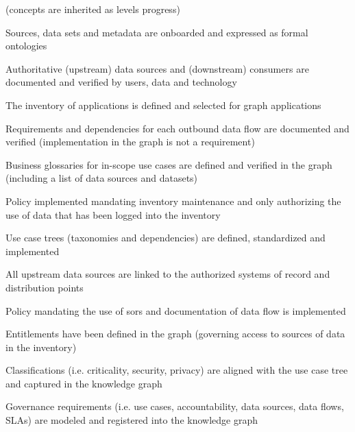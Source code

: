 \kgmmscoringsection

(concepts are inherited as levels progress)

\kgmmscoringlevelOne

\begin{scoring}

  \item Sources, data sets and metadata are onboarded and expressed as formal ontologies
  \item Authoritative (upstream) data sources and (downstream) consumers are documented and verified by users,
        data and technology
  \item The inventory of applications is defined and selected for graph applications
  \item Requirements and dependencies for each outbound data flow are documented and verified (implementation in the
        graph is not a requirement)
  \item Business glossaries for in-scope use cases are defined and verified in the graph (including a list of
        data sources and datasets)
  \item Policy implemented mandating inventory maintenance and only authorizing the use of data that has been logged
        into the inventory

\end{scoring}

\kgmmscoringlevelTwo

\begin{scoring}

  \item Use case trees (taxonomies and dependencies) are defined, standardized and implemented
  \item All upstream data sources are linked to the authorized systems of record and distribution points
  \item Policy mandating the use of \glspl{sor} and documentation of data flow is implemented
  \item Entitlements have been defined in the graph (governing access to sources of data in the inventory)
  \item Classifications (i.e. criticality, security, privacy) are aligned with the use case tree and captured in the
        knowledge graph
  \item Governance requirements (i.e. use cases, accountability, data sources, data flows, SLAs) are modeled and
        registered into the knowledge graph

\end{scoring}

